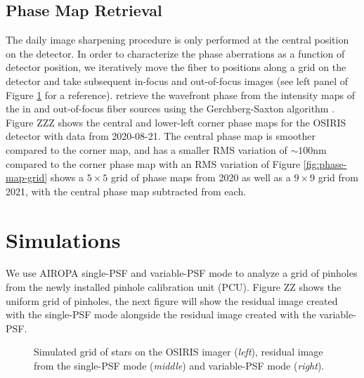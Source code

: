 \documentclass[]{spie}  %
\begin{document}
\subsection{Phase Map Retrieval} \label{subsec:phase_map_retrieval}
\indent The daily image sharpening procedure is only performed at the central position on the detector. In order to characterize the phase aberrations as a function of detector position, we iteratively move the fiber to positions along a grid on the detector and take subsequent in-focus and out-of-focus images (see left panel of Figure \ref{fig:grid_stars} for a reference). retrieve the wavefront phase from the intensity maps of the in and out-of-focus fiber sources using the Gerchberg-Saxton algorithm \cite{gerchberg:1972a}. Figure ZZZ shows the central and lower-left corner phase maps for the OSIRIS detector with data from 2020-08-21. The central phase map is smoother compared to the corner map, and has a smaller RMS variation of ${\sim}100$nm compared to the corner phase map with an RMS variation of  Figure \ref{fig:phase-map-grid} shows a $5\times5$ grid of phase maps from 2020 as well as a $9\times9$ grid from 2021, with the central phase map subtracted from each.

\section{Simulations} \label{sec:simulations}
We use AIROPA single-PSF and variable-PSF mode to analyze a grid of pinholes from the newly installed pinhole calibration unit (PCU). Figure ZZ shows the uniform grid of pinholes, the next figure will show the residual image created with the single-PSF mode alongside the residual image created with the variable-PSF.

\begin{figure}[!h]
 \caption{\footnotesize Simulated grid of stars on the OSIRIS imager (\textit{left}), residual image from the single-PSF mode (\textit{middle}) and variable-PSF mode (\textit{right}). \label{fig:grid_stars}}
\end{figure}
\end{document}
